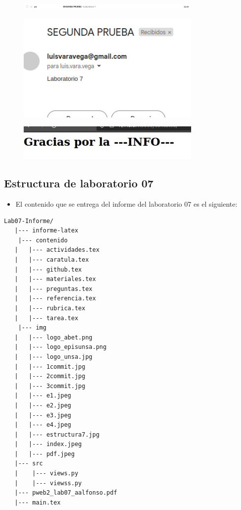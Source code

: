 \begin{figure}[H]
	\centering
	\includegraphics[width=0.8\textwidth,keepaspectratio]{img/e2.jpeg}
\end{figure}
\begin{figure}[H]
	\centering
	\includegraphics[width=0.8\textwidth,keepaspectratio]{img/e1.jpeg}
\end{figure}
\begin{figure}[H]
	\centering
	\includegraphics[width=0.8\textwidth,keepaspectratio]{img/e4.jpeg}
\end{figure}
\subsection{Estructura de laboratorio 07}
\begin{itemize}	
	\item El contenido que se entrega del informe del laboratorio 07 es el siguiente:
\end{itemize}

\begin{lstlisting}[style=ascii-tree]
	Lab07-Informe/
   |--- informe-latex
	|--- contenido
   |   |--- actividades.tex
   |   |--- caratula.tex
   |   |--- github.tex
   |   |--- materiales.tex
   |   |--- preguntas.tex
   |   |--- referencia.tex
   |   |--- rubrica.tex
   |   |--- tarea.tex
	|--- img
   |   |--- logo_abet.png
   |   |--- logo_episunsa.png
   |   |--- logo_unsa.jpg
   |   |--- 1commit.jpg
   |   |--- 2commit.jpg
   |   |--- 3commit.jpg
   |   |--- e1.jpeg
   |   |--- e2.jpeg
   |   |--- e3.jpeg
   |   |--- e4.jpeg
   |   |--- estructura7.jpg
   |   |--- index.jpeg
   |   |--- pdf.jpeg
   |--- src
   |    |--- views.py
   |    |--- viewss.py
   |--- pweb2_lab07_aalfonso.pdf    
   |--- main.tex
\end{lstlisting}    